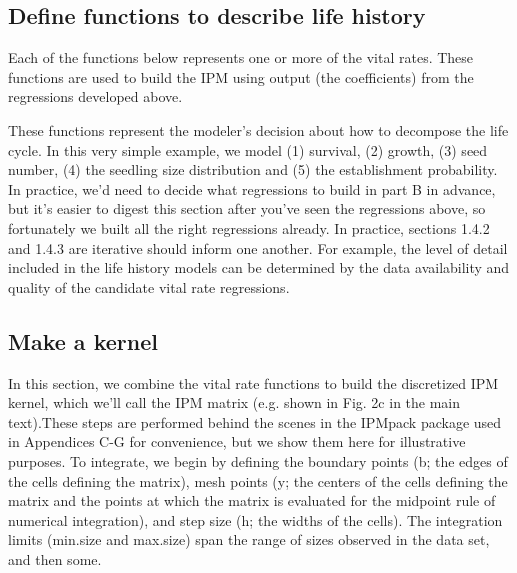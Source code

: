 \documentclass[11pt]{article}
\begin{document}
\subsection{Define functions to describe life history}
\label{sec:Define functions to describe life history}

Each of the functions below represents one or more of the vital rates. These functions are used to build the IPM using output (the coefficients) from the regressions developed above. 
  
These functions represent the modeler's decision about how to decompose the life cycle. In this very simple example, we model (1) survival, (2) growth, (3) seed number, (4) the seedling size distribution and (5) the establishment probability. In practice, we'd need to decide what regressions to build in part B in advance, but it's easier to digest this section after you've seen the regressions above, so fortunately we built all the right regressions already. In practice, sections 1.4.2 and 1.4.3 are iterative should inform one another. For example, the level of detail included in the life history models can be determined by the data availability and quality of the candidate vital rate regressions.
  
\begin{Schunk}
\end{Schunk}


\subsection{Make a kernel}
\label{sec:Make_a_kernel}
In this section, we combine the vital rate functions to build the discretized IPM kernel, which we'll call the IPM matrix (e.g. shown in Fig. 2c in the main text).These steps are performed behind the scenes in the IPMpack package used in Appendices C-G for convenience, but we show them here for illustrative purposes. To integrate, we begin by defining the boundary points (b; the edges of the cells defining the matrix), mesh points (y; the centers of the cells defining the matrix and the points at which the matrix is evaluated for the midpoint rule of numerical integration), and step size (h; the widths of the cells). The integration limits (min.size and max.size) span the range of sizes observed in the data set, and then some.
\end{document}
